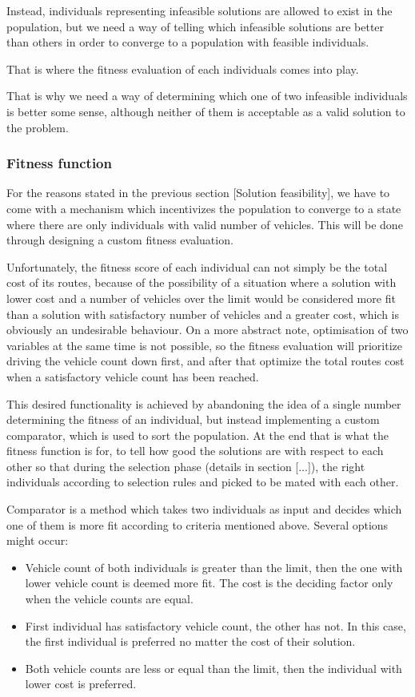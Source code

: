 \documentclass[oneside]{ctuthesis}
\theoremstyle{plain}
\theoremstyle{definition}
\theoremstyle{note}
\begin{document}
Instead, individuals representing infeasible solutions are allowed to exist in the population, but we need a way of telling which infeasible solutions are better than others in order to converge to a population with feasible individuals. 

That is where the fitness evaluation of each individuals comes into play.

That is why we need a way of determining which one of two infeasible individuals is better some sense, although neither of them is acceptable as a valid solution to the problem.

\subsubsection{Fitness function}
For the reasons stated in the previous section [Solution feasibility], we have to come with a mechanism which incentivizes the population to converge to a state where there are only individuals with valid number of vehicles. This will be done through designing a custom fitness evaluation.

Unfortunately, the fitness score of each individual can not simply be the total cost of its routes, because of the possibility of a situation where a solution with lower cost and a number of vehicles over the limit would be considered more fit than a solution with satisfactory number of vehicles and a greater cost, which is obviously an undesirable behaviour. On a more abstract note, optimisation of two variables at the same time is not possible, so the fitness evaluation will prioritize driving the vehicle count down first, and after that optimize the total routes cost when a satisfactory vehicle count has been reached.

This desired functionality is achieved by abandoning the idea of a single number determining the fitness of an individual, but instead implementing a custom comparator, which is used to sort the population. At the end that is what the fitness function is for, to tell how good the solutions are with respect to each other so that during the selection phase (details in section [...]), the right individuals according to selection rules and picked to be mated with each other. 

Comparator is a method which takes two individuals as input and decides which one of them is more fit according to criteria mentioned above. Several options might occur:
\begin{itemize}
	\item Vehicle count of both individuals is greater than the limit, then the one with lower vehicle count is deemed more fit. The cost is the deciding factor only when the vehicle counts are equal.
	\item First individual has satisfactory vehicle count, the other has not. In this case, the first individual is preferred no matter the cost of their solution.
	\item Both vehicle counts are less or equal than the limit, then the individual with lower cost is preferred.
\end{itemize}
\end{document}
